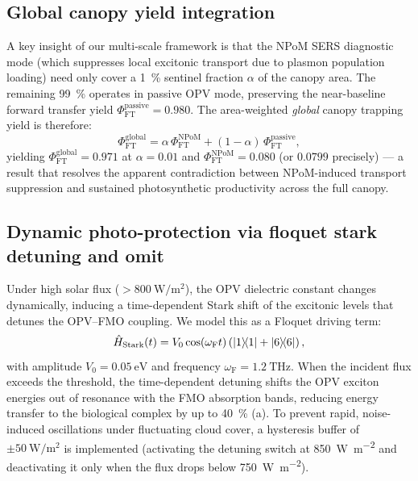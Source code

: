 \documentclass[onecolumn,a4paper,12pt]{article}
\begin{document}
\subsection*{Global canopy yield integration}

A key insight of our multi-scale framework is that the NPoM SERS diagnostic mode (which suppresses local excitonic transport due to plasmon population loading) need only cover a \qty{1}{\percent} sentinel fraction $\alpha$ of the canopy area. The remaining \qty{99}{\percent} operates in passive OPV mode, preserving the near-baseline forward transfer yield $\Phi_{\mathrm{FT}}^{\mathrm{passive}} = 0.980$. The area-weighted \emph{global} canopy trapping yield is therefore:
\begin{equation}
  \Phi_{\mathrm{FT}}^{\mathrm{global}} = \alpha\,\Phi_{\mathrm{FT}}^{\mathrm{NPoM}} + (1-\alpha)\,\Phi_{\mathrm{FT}}^{\mathrm{passive}},
  \label{eq:phi_global}
\end{equation}
yielding $\Phi_{\mathrm{FT}}^{\mathrm{global}} = 0.971$ at $\alpha = 0.01$ and $\Phi_{\mathrm{FT}}^{\mathrm{NPoM}} = 0.080$ (or $0.0799$ precisely) --- a result that resolves the apparent contradiction between NPoM-induced transport suppression and sustained photosynthetic productivity across the full canopy.

\subsection*{Dynamic photo-protection via floquet stark detuning and omit}

Under high solar flux ($> \qty{800}{\W\per\m\squared}$), the OPV dielectric constant changes dynamically, inducing a time-dependent Stark shift of the excitonic levels that detunes the OPV--FMO coupling.
We model this as a Floquet driving term:
\begin{equation}
\hat{H}_{\mathrm{Stark}}(t) = V_0 \cos(\omega_{\mathrm{F}} t) \left( \dyad{1}{1} + \dyad{6}{6} \right),
\label{eq:stark_detuning}
\end{equation}
with amplitude $V_0 = \qty{0.05}{\eV}$ and frequency $\omega_{\mathrm{F}} = \qty{1.2}{\THz}$.
When the incident flux exceeds the threshold, the time-dependent detuning shifts the OPV exciton energies out of resonance with the FMO absorption bands, reducing energy transfer to the biological complex by up to \qty{40}{\percent} (a). To prevent rapid, noise-induced oscillations under fluctuating cloud cover, a hysteresis buffer of $\pm \qty{50}{\W\per\m\squared}$ is implemented (activating the detuning switch at \qty{850}{\W\per\m\squared} and deactivating it only when the flux drops below \qty{750}{\W\per\m\squared}).
\end{document}

